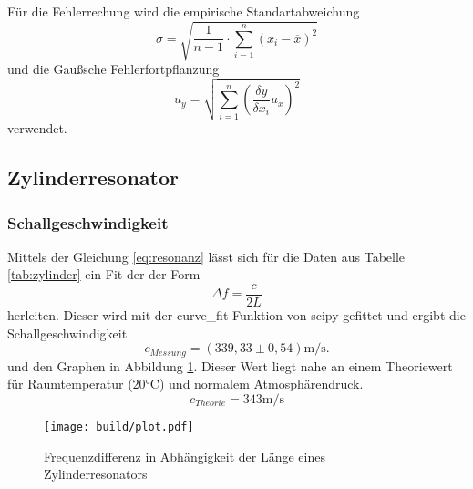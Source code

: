 Für die Fehlerrechung wird die empirische Standartabweichung
\begin{equation}
  \sigma = \sqrt{\frac{1}{n-1} \cdot \sum_{i=1}^n(x_i-\overline{x})^2}
  \label{eqn:Stdabweichung}
\end{equation}
und die Gaußsche Fehlerfortpflanzung
\begin{equation}
  u_y = \sqrt{\sum_{i=1}^n\left(\frac{\delta y}{\delta x_i}u_x\right)^2}
  \label{eqn:gauß}
\end{equation}
verwendet.

\subsection{Zylinderresonator}
\subsubsection{Schallgeschwindigkeit}
Mittels der Gleichung \eqref{eq:resonanz} lässt sich für die Daten aus Tabelle \ref{tab:zylinder} ein Fit der der Form
\begin{equation}
  \Delta f = \frac{c}{2L}
\end{equation}
herleiten. Dieser wird mit der curve\_fit Funktion von scipy \cite{scipy} gefittet und ergibt die Schallgeschwindigkeit
\begin{equation}
  c_{Messung} =(339,33\pm 0,54)\si{\metre\per\second}.
\end{equation}
und den Graphen in Abbildung \ref{fig:plot_zylinder}.
Dieser Wert liegt nahe an einem Theoriewert für Raumtemperatur ($20°$C) und normalem Atmosphärendruck.
\begin{equation}
  c_{Theorie} =343\si{\metre\per\second}
\end{equation}


\begin{figure}
  \centering
  \texttt{[image: build/plot.pdf]}
  \caption{Frequenzdifferenz in Abhängigkeit der Länge eines Zylinderresonators}
  \label{fig:plot_zylinder}
\end{figure}